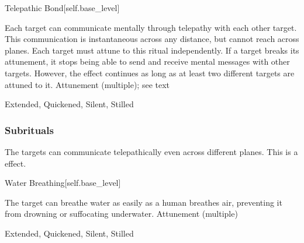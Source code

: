 \begin{spellsection}{Telepathic Bond}[self.base_level]
\begin{spellcontent}
\begin{spelltargetinginfo}
\end{spelltargetinginfo}
\begin{spelleffects}
\spelleffect
Each target can communicate mentally through telepathy with each other target.
This communication is instantaneous across any distance, but cannot reach across planes.
Each target must attune to this ritual independently.
If a target breaks its attunement, it stops being able to send and receive mental messages with other targets.
However, the effect continues as long as at least two different targets are attuned to it.
\spelldur Attunement (multiple); see text
\end{spelleffects}
\end{spellcontent}
\begin{spellfooter}
 Extended, Quickened, Silent, Stilled
\end{spellfooter}
\begin{spellsubcontent}
\end{spellsubcontent}
\end{spellsection}
\subsubsection{Subrituals}
The targets can communicate telepathically even across different planes.
This is a  effect.
\begin{spellsection}{Water Breathing}[self.base_level]
\begin{spellcontent}
\begin{spelltargetinginfo}
\end{spelltargetinginfo}
\begin{spelleffects}
\spelleffect
The target can breathe water as easily as a human breathes air, preventing it from drowning or suffocating underwater.
\spelldur Attunement (multiple)
\end{spelleffects}
\end{spellcontent}
\begin{spellfooter}
 Extended, Quickened, Silent, Stilled
\end{spellfooter}
\begin{spellsubcontent}
\end{spellsubcontent}
\end{spellsection}
